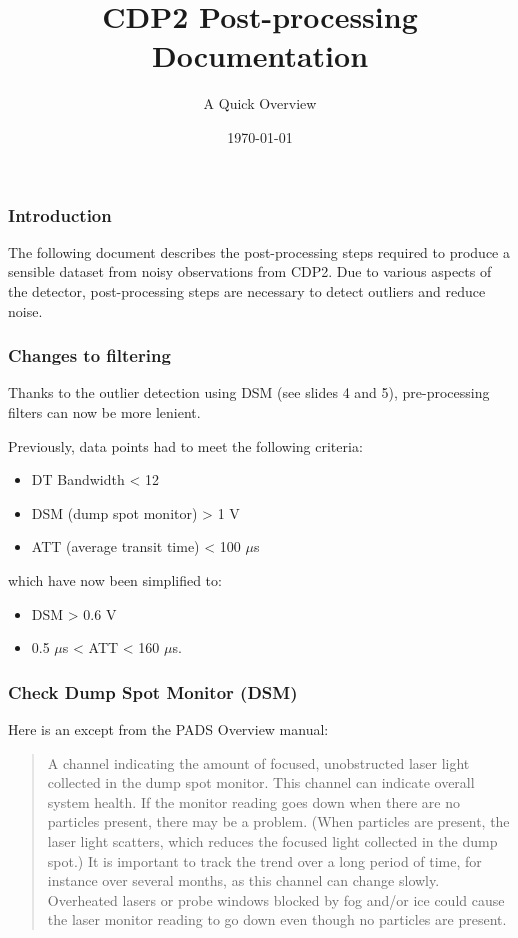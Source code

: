 \documentclass{beamer}
\title{CDP2 Post-processing Documentation}
\subtitle{A Quick Overview}
\date{\today}
\begin{document}
\frame{\titlepage}

\begin{frame}
    \frametitle{Introduction}
    The following document describes the post-processing steps required to produce a sensible dataset from noisy observations from CDP2. Due to various aspects of the detector, post-processing steps are necessary to detect outliers and reduce noise.
\end{frame}

\begin{frame}
    \frametitle{Changes to filtering}
    Thanks to the outlier detection using DSM (see slides 4 and 5), pre-processing filters can now be more lenient.

    Previously, data points had to meet the following criteria:

    \begin{itemize}
        \item DT Bandwidth < 12
        \item DSM (dump spot monitor) > 1 V
        \item ATT (average transit time) < 100 $\mu$s\footnotemark[1]
    \end{itemize}

    which have now been simplified to:

    \begin{itemize}
        \item DSM > 0.6 V
        \item 0.5 $\mu$s < ATT < 160 $\mu$s.
    \end{itemize}

\end{frame}

\begin{frame}
    \frametitle{Check Dump Spot Monitor (DSM)}
    Here is an except from the PADS Overview manual:

    \begin{quotation}
        \small{A channel indicating the amount of focused, unobstructed laser light collected in the dump spot monitor. This channel can indicate overall system health. If the monitor reading goes down when there are no particles present, there may be a problem. (When particles are present, the laser light scatters, which reduces the focused light collected in the dump spot.) It is important to track the trend over a long period of time, for instance over several months, as this channel can change slowly. Overheated lasers or probe windows blocked by fog and/or ice could cause the laser monitor reading to go down even though no particles are present.}
    \end{quotation}
\end{frame}
\end{document}
